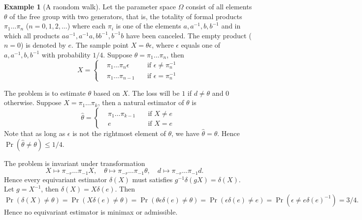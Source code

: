 \documentclass{article}
\theoremstyle{plain}
\theoremstyle{definition}
\newtheorem{example}{Example}
\begin{document}
\begin{example}[A raondom walk]
    Let the parameter space $\Omega$ consist of all elements $\theta$ of the free group with two generators, that is, the totality of formal products $\pi_1\ldots\pi_n$ ($n=0,1,2,\ldots$) where each $\pi_i$ is one of the elements $a,a^{-1},b,b^{-1}$ and in which all products $aa^{-1},a^{-1}a,bb^{-1},b^{-1}b$ have been canceled. The empty product ($n=0$) is denoted by $e$.
    The sample point $X=\theta \epsilon$, where $\epsilon$ equals one of $a,a^{-1},b,b^{-1}$ with probability $1/4$.
    Suppose $\theta=\pi_1\ldots\pi_n$, then
    \begin{equation*}
        X=\left\{
            \begin{aligned} 
                &\pi_1\ldots\pi_n \epsilon\quad& \textrm{if $\epsilon\neq \pi_n^{-1}$}\\
                &\pi_1\ldots\pi_{n-1} \quad& \textrm{if $\epsilon=\pi_n^{-1}$}
            \end{aligned}
            \right.
    \end{equation*}
    

    The problem is to estimate $\theta$ based on $X$.
    The loss will be $1$ if $d\neq\theta$ and $0$ otherwise.
    Suppose $X=\pi_1\ldots\pi_k$, then a natural estimator of $\theta$ is
    \begin{equation*}
        \hat{\theta}=\left\{
            \begin{aligned}
                &\pi_1\ldots\pi_{k-1} \quad& \textrm{if $X\neq e$}\\
                &e \quad& \textrm{if $X=e$}
            \end{aligned}
            \right.
    \end{equation*}
    Note that as long as $\epsilon$ is not the rightmost element of $\theta$, we have $\hat{\theta}=\theta$.
    Hence $\Pr(\hat{\theta}\neq \theta)\leq 1/4$.

The problem is invariant under transformation
    \begin{equation*}
        X\mapsto \pi_{-r}\ldots\pi_{-1} X,
        \quad
        \theta\mapsto \pi_{-r}\ldots\pi_{-1} \theta,
        \quad
        d\mapsto \pi_{-r}\ldots\pi_{-1} d.
        \quad
    \end{equation*}
    Hence every equivariant estimator $\delta(X)$ must satisfies
    $g^{-1}\delta(gX)=\delta(X)$.
    Let $g={X^{-1}}$, then $\delta(X)=X\delta(e)$.
    Then
    \begin{equation*}
        \Pr(\delta(X)\neq \theta)=
        \Pr(X\delta(e)\neq \theta)=
        \Pr(\theta\epsilon\delta(e)\neq \theta)=
        \Pr(\epsilon\delta(e)\neq e)=
        \Pr(\epsilon\neq e\delta(e)^{-1})=3/4.
    \end{equation*}
    Hence no equivariant estimator is minimax or admissible.
\end{example}
\end{document}
